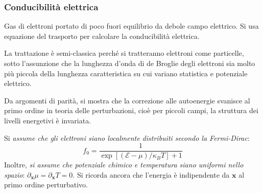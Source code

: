 \documentclass[10pt, a4paper]{scrartcl}
\numberwithin{equation}{subsection}
\theoremstyle{style1}
\begin{document}
\subsubsection{Conducibilit\`a elettrica}
Gas di elettroni portato di poco fuori equilibrio da debole campo elettrico.
Si usa equazione del trasporto per calcolare la conducibilit\`a elettrica.

La trattazione \`e semi-classica perch\'e si tratteranno elettroni come particelle, sotto l'assunzione che la lunghezza d'onda
di de Broglie degli elettroni sia molto pi\`u piccola della lunghezza caratteristica su cui variano statistica e potenziale elettrico.

Da argomenti di parit\`a, si mostra che la correzione alle autoenergie svanisce al primo ordine in teoria delle perturbazioni, cio\`e per piccoli campi,
la struttura dei livelli energetivi \`e invariata.

Si \textit{assume che gli elettroni siano localmente distribuiti secondo la Fermi-Dirac}:
\begin{equation}
	f_0 = \frac{1}{\exp\left[ (\mathscr{E}-\mu ) /\kappa _B T  \right] +1}
\end{equation}
Inoltre, \textit{si assume che potenziale chimico e temperatura siano uniformi nello spazio}: $\partial _\mathbf{x} \mu = \partial _\mathbf{x} T = 0$.
Si ricorda ancora che l'energia \`e indipendente da $\mathbf{x} $ al primo ordine perturbativo.
\end{document}
